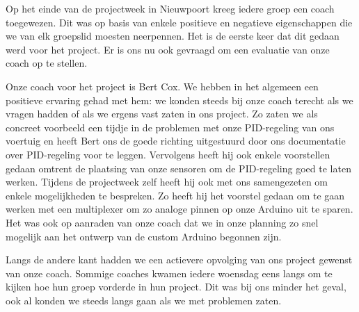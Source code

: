 Op het einde van de projectweek in Nieuwpoort kreeg iedere groep een coach toegewezen. Dit was op basis van enkele positieve en negatieve eigenschappen die we van elk groepslid moesten neerpennen. Het is de eerste keer dat dit gedaan werd voor het project. Er is ons nu ook gevraagd om een evaluatie van onze coach op te stellen.

Onze coach voor het project is Bert Cox. We hebben in het algemeen een positieve ervaring gehad met hem: we konden steeds bij onze coach terecht als we vragen hadden of als we ergens vast zaten in ons project. Zo zaten we als concreet voorbeeld een tijdje in de problemen met onze PID-regeling van ons voertuig en heeft Bert ons de goede richting uitgestuurd door ons documentatie over PID-regeling voor te leggen. Vervolgens heeft hij ook enkele voorstellen gedaan omtrent de plaatsing van onze sensoren om de PID-regeling goed te laten werken. Tijdens de projectweek zelf heeft hij ook met ons samengezeten om enkele mogelijkheden te bespreken. Zo heeft hij het voorstel gedaan om te gaan werken met een multiplexer om zo analoge pinnen op onze Arduino uit te sparen. Het was ook op aanraden van onze coach dat we in onze planning zo snel mogelijk aan het ontwerp van de custom Arduino begonnen zijn. 

Langs de andere kant hadden we een actievere opvolging van ons project gewenst van onze coach. Sommige coaches kwamen iedere woensdag eens langs om te kijken hoe hun groep vorderde in hun project. Dit was bij ons minder het geval, ook al konden we steeds langs gaan als we met problemen zaten. 